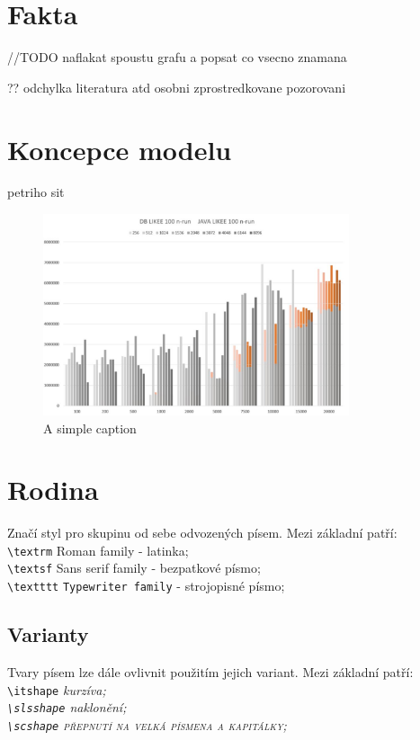 \documentclass[a4paper, 11pt]{article}
\begin{document}
\section{Fakta}
//TODO naflakat spoustu grafu a popsat co vsecno znamana

?? odchylka
literatura atd 
osobni zprostredkovane pozorovani


\section{Koncepce modelu}
petriho sit


\begin{figure}[ht!]
\centering
\includegraphics[width=90mm]{test.jpg}
\caption{A simple caption \label{overflow}}
\end{figure}


\section{Rodina}
Značí styl pro skupinu od sebe odvozených písem. Mezi základní patří: \\ 
\verb|\textrm| \hspace{0.5cm} \textrm{Roman family} - latinka;\\
\verb|\textsf| \hspace{0.5cm} \textsf{Sans serif family} - bezpatkové písmo;\\
\verb|\textttt| \hspace{0.3cm} \texttt{Typewriter family} - strojopisné písmo;
\cite{latex_kompletni_pruvodce, typograficky_manual}

\subsection{Varianty}
Tvary písem lze dále ovlivnit použitím jejich variant. Mezi základní patří: \\
\verb|\itshape| \hspace{0.5cm} \itshape{kurzíva;} \\
\verb|\slsshape| \hspace{0.28cm} \slshape{naklonění;} \\
\verb|\scshape| \hspace{0.5cm} \scshape přepnutí na velká písmena a kapitálky; \normalfont
\cite{latex_kompletni_pruvodce, typograficky_manual}
\end{document}
